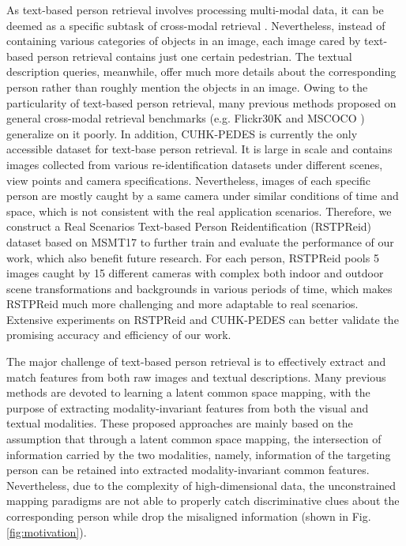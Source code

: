 \documentclass[sigconf]{acmart}
\begin{document}
As text-based person retrieval involves processing multi-modal data, it can be deemed as a specific subtask of cross-modal retrieval \cite{yan2015DCCA, karpathy2015DVSA, nam2017DAN, liu2017RRFNet, sun2019supervisedhashingsigir, SCAN}. Nevertheless, instead of containing various categories of objects in an image, each image cared by text-based person retrieval contains just one certain pedestrian. The textual description queries, meanwhile, offer much more details about the corresponding person rather than roughly mention the objects in an image. Owing to the particularity of text-based person retrieval, many previous methods proposed on general cross-modal retrieval benchmarks (e.g. Flickr30K \cite{plummer2015flickr30k} and MSCOCO \cite{MSCOCO}) generalize on it poorly. In addition, CUHK-PEDES \cite{Shuang2017Person} is currently the only accessible dataset for text-base person retrieval. It is large in scale and contains images collected from various re-identification datasets under different scenes, view points and camera specifications. Nevertheless, images of each specific person are mostly caught by a same camera under similar conditions of time and space, which is not consistent with the real application scenarios. Therefore, we construct a Real Scenarios Text-based Person Reidentification (RSTPReid) dataset based on MSMT17 \cite{MSMT17} to further train and evaluate the performance of our work, which also benefit future research. For each person, RSTPReid pools 5 images caught by 15 different cameras with complex both indoor and outdoor scene transformations and backgrounds in various periods of time, which makes RSTPReid much more challenging and more adaptable to real scenarios. Extensive experiments on RSTPReid and CUHK-PEDES can better validate the promising accuracy and efficiency of our work.

The major challenge of text-based person retrieval is to effectively extract and match features from both raw images and textual descriptions. Many previous methods \cite{ARL, mm2019graphreid, niu2020improving, Jing2018Pose, wang2020img} are devoted to learning a latent common space mapping, with the purpose of extracting modality-invariant features from both the visual and textual modalities. These proposed approaches are mainly based on the assumption that through a latent common space mapping, the intersection of information carried by the two modalities, namely, information of the targeting person can be retained into extracted modality-invariant common features. Nevertheless, due to the complexity of high-dimensional data, the unconstrained mapping paradigms are not able to properly catch discriminative clues about the corresponding person while drop the misaligned information (shown in Fig. \ref{fig:motivation}).
\end{document}
